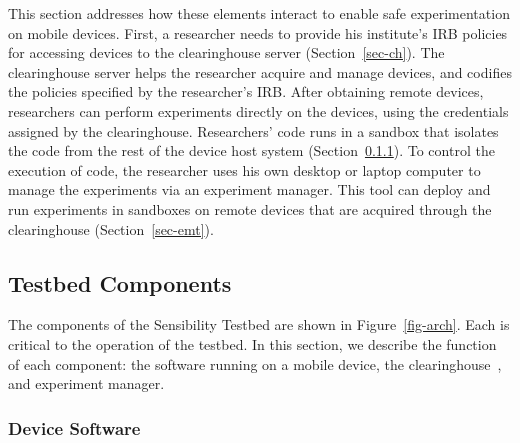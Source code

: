 This section addresses how these elements interact to
enable safe experimentation on mobile devices. First, 
a researcher needs to provide his institute's 
IRB policies for accessing devices to the clearinghouse 
server (Section~\ref{sec-ch}).  
The clearinghouse server helps the researcher acquire and manage
devices, and codifies the policies specified by the
researcher's IRB. 
After obtaining remote devices, researchers can perform
experiments directly on the devices, using the credentials assigned by
the clearinghouse. Researchers' code runs in a sandbox 
that isolates the code from the rest of the device
host system (Section~\ref{sec-repy}). To control the execution of 
code, the researcher uses his own desktop or laptop computer to manage the 
experiments via an experiment manager. This tool can deploy 
and run experiments in sandboxes on remote devices that are 
acquired through the clearinghouse (Section~\ref{sec-emt}).



\subsection{Testbed Components}\label{sec-component}

The components of the Sensibility Testbed are shown in Figure~\ref{fig-arch}.
Each is critical to the operation of the testbed. 
In this section, we describe the function of each component: the
software running on a mobile device, the clearinghouse~\cite{ch}, 
and experiment manager.

\subsubsection{Device Software}\label{sec-repy}

